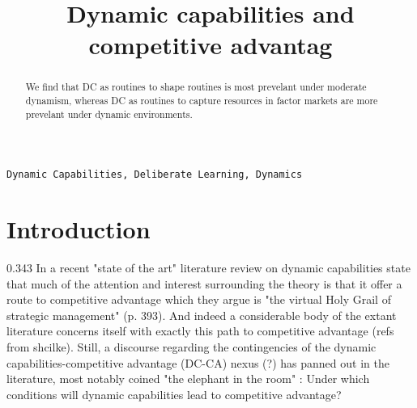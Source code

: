 \documentclass[review,fleqn]{elsarticle}\usepackage[]{graphicx}\usepackage[]{color}
\begin{document}
\begin{frontmatter}


\title{Dynamic capabilities and competitive advantag}





\begin{abstract}
 We find that DC as routines to shape routines is most prevelant under moderate dynamism,
whereas DC as routines to capture resources in factor markets are more prevelant under
dynamic environments.

\end{abstract}

\begin{keyword}
\texttt{Dynamic Capabilities, Deliberate Learning, Dynamics }
\end{keyword}

\end{frontmatter}



\doublespacing


\section{Introduction}

0.343
In a recent "state of the art" literature review on dynamic capabilities
\cite{Schilke2018} state that much of the attention and interest surrounding the theory is
that it offer a route to competitive advantage which they argue is "the virtual Holy Grail
of strategic management" (p. 393). And indeed a considerable body of the extant literature
concerns itself with exactly this path to competitive advantage (refs from
shcilke). Still, a discourse regarding the contingencies of the dynamic
capabilities-competitive advantage (DC-CA) nexus (?) has panned out in the literature,
most notably coined "the elephant in the room" \citep{Peteraf2013}: Under which conditions
will dynamic capabilities lead to competitive advantage?
\end{document}
